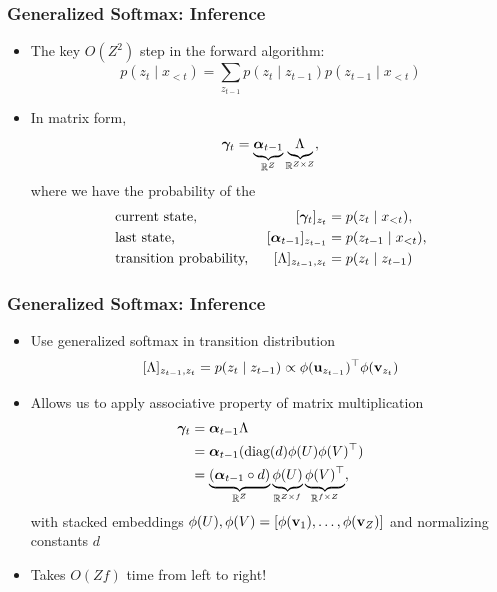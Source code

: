 \documentclass{beamer}
\begin{document}
\begin{frame}
\frametitle{Generalized Softmax: Inference}
\begin{itemize}
\item The key $O(Z^2)$ step in the forward algorithm:
$$
p(z_t \mid x_{<t}) = \sum_{z_{t-1}} p(z_t \mid z_{t-1})p(z_{t-1} \mid x_{<t})
$$
\vspace{1em}
\item In matrix form, 
\begin{equation*}
\bm\gamma_t = \underbrace{\bm\alpha_{t-1}}_{\mathbb{R}^Z}\underbrace{\Lambda_{}}_{\mathbb{R}^{Z \times Z}},
\end{equation*}
where we have the probability of the
\begin{align*}
&\textnormal{current state, } & [\bm\gamma_{t}]_{z_{t}} &= p(z_{t} \mid x_{< t}),\\
&\textnormal{last state, } & [\bm\alpha_{t-1}]_{z_{t-1}} &= p(z_{t-1} \mid x_{< t}),\\
&\textnormal{transition probability, } & [\Lambda]_{z_{t-1},z_t} &= p(z_t\mid z_{t-1})
\end{align*}
\end{itemize}
\end{frame}

\begin{frame}
\frametitle{Generalized Softmax: Inference}
\begin{itemize}
\item Use generalized softmax in transition distribution
$$[\Lambda]_{z_{t-1},z_t} = p(z_t\mid z_{t-1}) \propto \phi(\mathbf{u}_{z_{t-1}})^\top\phi(\mathbf{v}_{z_t})$$
\item Allows us to apply associative property of matrix multiplication
\begin{align*}
\bm\gamma_t
&= \bm\alpha_{t-1}\Lambda\\
&= \bm\alpha_{t-1}(\textrm{diag}(d)\phi(U)\phi(V)^\top)\\
&= \underbrace{(\bm\alpha_{t-1}\circ d)}_{\mathbb{R}^Z}
\underbrace{\phi(U)}_{\mathbb{R}^{Z \times f}}
\underbrace{\phi(V)^\top}_{\mathbb{R}^{f \times Z}},
\end{align*}
with stacked embeddings $\phi(U),\phi(V) = [\phi(\mathbf{v}_1), \ldots,\phi(\mathbf{v}_Z)]$
and normalizing constants $d$
\vspace{1em}
\item Takes $O(Zf)$ time from left to right!
\end{itemize}
\end{frame}
\end{document}
